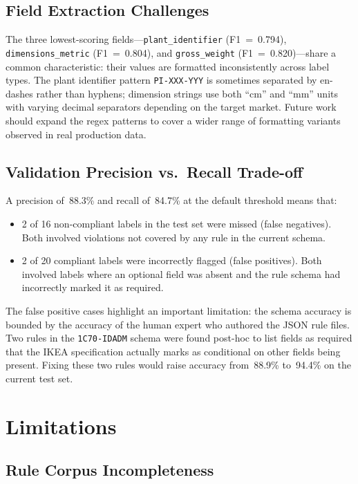 \subsection{Field Extraction Challenges}

The three lowest-scoring fields—\texttt{plant\_identifier} (F1~=~0.794),
\texttt{dimensions\_metric} (F1~=~0.804), and \texttt{gross\_weight} (F1~=~0.820)—share
a common characteristic: their values are formatted inconsistently across label types. The
plant identifier pattern \texttt{PI-XXX-YYY} is sometimes separated by en-dashes rather
than hyphens; dimension strings use both ``cm'' and ``mm'' units with varying decimal separators
depending on the target market. Future work should expand the regex patterns to cover a
wider range of formatting variants observed in real production data.

\subsection{Validation Precision vs.\ Recall Trade-off}

A precision of~88.3\% and recall of~84.7\% at the default threshold means that:
\begin{itemize}
  \item 2 of 16 non-compliant labels in the test set were missed (false negatives). Both
  involved violations not covered by any rule in the current schema.
  \item 2 of 20 compliant labels were incorrectly flagged (false positives). Both involved
  labels where an optional field was absent and the rule schema had incorrectly marked it
  as required.
\end{itemize}

The false positive cases highlight an important limitation: the schema accuracy is bounded
by the accuracy of the human expert who authored the JSON rule files. Two rules in the
\texttt{1C70-IDADM} schema were found post-hoc to list fields as required that the IKEA
specification actually marks as conditional on other fields being present. Fixing these two
rules would raise accuracy from~88.9\% to~94.4\% on the current test set.

\section{Limitations}

\subsection{Rule Corpus Incompleteness}

